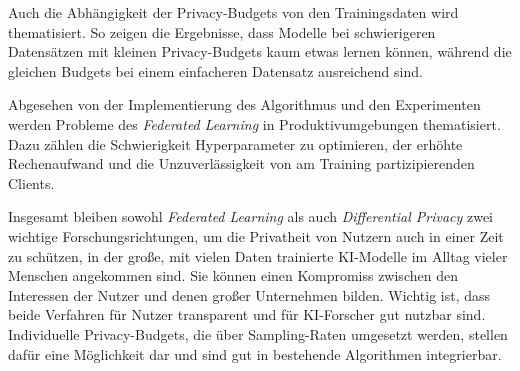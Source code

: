 Auch die Abhängigkeit der Privacy-Budgets von den Trainingsdaten wird thematisiert. So zeigen die Ergebnisse, dass Modelle bei schwierigeren Datensätzen mit kleinen Privacy-Budgets kaum etwas lernen können, während die gleichen Budgets bei einem einfacheren Datensatz ausreichend sind.

Abgesehen von der Implementierung des Algorithmus und den Experimenten werden Probleme des \textit{Federated Learning} in Produktivumgebungen thematisiert. Dazu zählen die Schwierigkeit Hyperparameter zu optimieren, der erhöhte Rechenaufwand und die Unzuverlässigkeit von am Training partizipierenden Clients.

Insgesamt bleiben sowohl \textit{Federated Learning} als auch \textit{Differential Privacy} zwei wichtige Forschungsrichtungen, um die Privatheit von Nutzern auch in einer Zeit zu schützen, in der große, mit vielen Daten trainierte KI-Modelle im Alltag vieler Menschen angekommen sind. Sie können einen Kompromiss zwischen den Interessen der Nutzer und denen großer Unternehmen bilden. Wichtig ist, dass beide Verfahren für Nutzer transparent und für KI-Forscher gut nutzbar sind. Individuelle Privacy-Budgets, die über Sampling-Raten umgesetzt werden, stellen dafür eine Möglichkeit dar und sind gut in bestehende Algorithmen integrierbar.